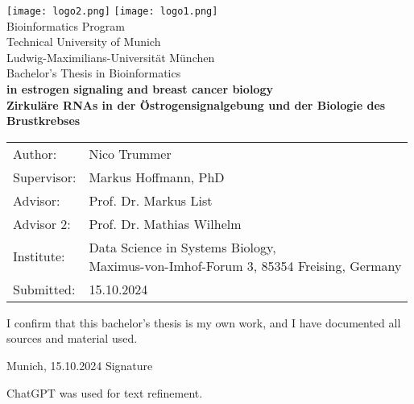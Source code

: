\documentclass[pdftex,12pt,a4paper]{report}
\begin{document}
\begin{titlepage}

    \begin{center}
        \texttt{[image: logo2.png]}
        \hfill
        \texttt{[image: logo1.png]}
        \\[3cm]

        {\Large Bioinformatics Program}\\[0.5cm]
        {\Large Technical University of Munich}\\[0.5cm]
        {\Large Ludwig-Maximilians-Universit\"at M\"unchen}\\[1cm]
        {\Large Bachelor's Thesis in Bioinformatics}\\[1.5cm]
        {\textbf{\LARGE {} in estrogen signaling and
            breast cancer
            biology}}\\[1.5cm]
        {\textbf{\LARGE Zirkul\"are RNAs in der \"Ostrogensignalgebung und
            der
            Biologie des
            Brustkrebses}}\\[2cm]

    \end{center}

    \begin{center}\Large
        \begin{tabular}{ll}
            Author: & Nico Trummer \\ Supervisor: & Markus Hoffmann, PhD \\ Advisor: &
               Prof.
               Dr.
            Markus List            \\ Advisor 2: & Prof.
               Dr.
            Mathias Wilhelm        \\ Institute: & \makecell[l]{Data Science in Systems
            Biology,               \\ Maximus-von-Imhof-Forum 3, 85354 Freising,
            Germany}               \\ Submitted: & 15.10.2024\end{tabular} \end{center}

\end{titlepage} 

\noindent I confirm that this bachelor's thesis is my own work, and I have
documented all sources and material used.

\vspace{3cm}

\noindent Munich, 15.10.2024 \hfill Signature

\pagebreak



\renewcommand{\baselinestretch}{0.95}\normalsize
\tableofcontents
\renewcommand{\baselinestretch}{1.0}\normalsize







\printbibliography

ChatGPT was used for text refinement.
\end{document}
